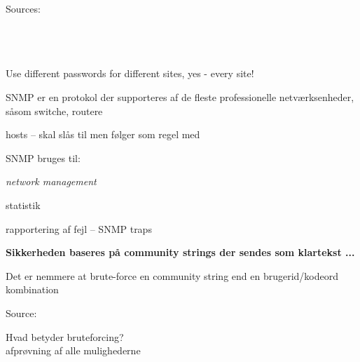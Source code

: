 \documentclass[Screen16to9,17pt]{foils}
\begin{document}

 Sources:\\
{\footnotesize{}\\
\\
\\
}

\vskip 5mm
\centerline{Use different passwords for different sites, yes - every site!}



\begin{list1}
\item SNMP er en protokol der supporteres af de fleste professionelle
  netværksenheder, såsom switche, routere
\item hosts -- skal slås til men følger som regel med
\item SNMP bruges til:
  \begin{list2}
    \item \emph{network management}
    \item statistik
    \item rapportering af fejl -- SNMP traps
  \end{list2}
\item {\bfseries Sikkerheden baseres på community strings der sendes
    som klartekst ...}
\item Det er nemmere at brute-force en community string end en
  brugerid/kodeord kombination
\end{list1}




Source:




\begin{list1}
\item Hvad betyder bruteforcing?\\
afprøvning af alle mulighederne
\end{list1}
\end{document}
